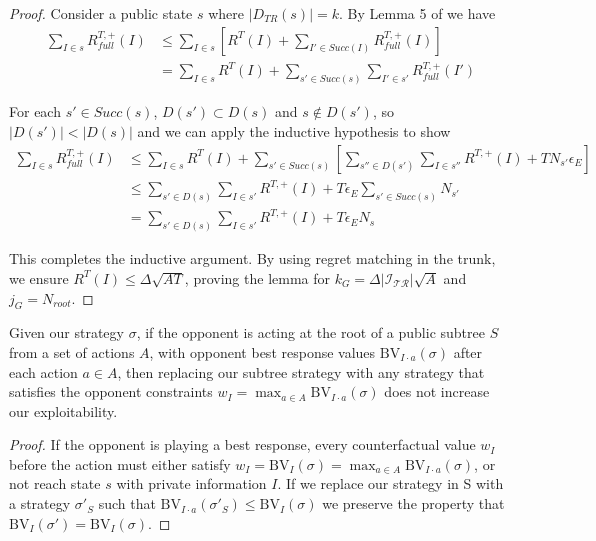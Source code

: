 \begin{proof}
  Consider a public state $s$ where $|D_{TR}(s)| = k$. By Lemma 5 of \cite{ZinkevichEtAl07}
  we have
  \begin{align*}
  \sum_{I \in s} R^{T,+}_{full}(I) &\leq \sum_{I \in s}\left[R^T(I) + \sum_{I' \in Succ(I)}R^{T,+}_{full}(I)\right]\\
  &= \sum_{I \in s} R^T(I) + \sum_{s' \in Succ(s)} \sum_{I' \in s'} R^{T,+}_{full}(I')
  \end{align*}

  For each $s' \in Succ(s)$, $D(s') \subset D(s)$ and $s \not\in D(s')$, so $|D(s')|<|D(s)|$
  and we can apply the inductive hypothesis to show
  \begin{align*}
  \sum_{I \in s} R^{T,+}_{full}(I) &\leq \sum_{I \in s} R^T(I) + \sum_{s' \in Succ(s)} \left[\sum_{s'' \in D(s')}\sum_{I \in s''} R^{T,+}(I) + TN_{s'}\epsilon_E\right]\\
  &\leq \sum_{s' \in D(s)}\sum_{I \in s'} R^{T,+}(I) + T\epsilon_E \sum_{s' \in Succ(s)} N_{s'}\\
  &= \sum_{s' \in D(s)}\sum_{I \in s'} R^{T,+}(I) + T\epsilon_E N_s
  \end{align*}

  This completes the inductive argument. By using regret matching in the trunk, we ensure
  $R^T(I) \leq \Delta\sqrt{AT}$, proving the lemma for $k_G = \Delta|\mathcal{I_{TR}}|\sqrt{A}$
  and $j_G = N_{root}$.
\end{proof}

\begin{lemma}
  Given our strategy $\sigma$, if the opponent is acting at the root
  of a public subtree $S$ from a set of actions $A$, with opponent
  best response values $\text{BV}_{I \cdot a}(\sigma)$ after each
  action $a \in A$, then replacing our subtree strategy with any
  strategy that satisfies the opponent constraints $w_I = \max_{a \in
    A} \text{BV}_{I \cdot a}(\sigma)$ does not increase our
  exploitability.
  \label{lem:opp_constraint_values}
\end{lemma}
\begin{proof}
  If the opponent is playing a best response, every counterfactual
  value $w_I$ before the action must either satisfy $w_I =
  \text{BV}_I(\sigma) = \max_{a \in A} \text{BV}_{I \cdot a}(\sigma)$,
  or not reach state $s$ with private information $I$. If we replace
  our strategy in S with a strategy $\sigma'_S$ such that
  $\text{BV}_{I \cdot a}(\sigma'_S) \le \text{BV}_I(\sigma)$ we
  preserve the property that $\text{BV}_I(\sigma') =
  \text{BV}_I(\sigma)$.
\end{proof}

